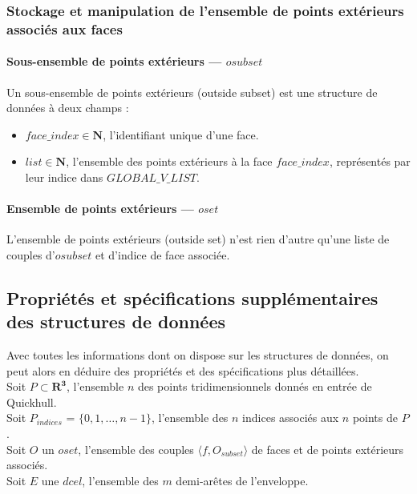 \documentclass[]{article}
\begin{document}
\subsubsection{Stockage et manipulation de l'ensemble de points extérieurs associés aux faces}
\paragraph*{Sous-ensemble de points extérieurs — $osubset$}
Un sous-ensemble de points extérieurs (outside subset) est une structure de données à deux champs :
\begin{itemize}
	\item $face\_index \in \mathbf{N}$, l'identifiant unique d'une face.
	\item $list \in \mathbf{N}$, l'ensemble des points extérieurs à la face $face\_index$, représentés par leur indice dans $GLOBAL\_V\_LIST$.
\end{itemize}

\paragraph*{Ensemble de points extérieurs — $oset$}
L'ensemble de points extérieurs (outside set) n'est rien d'autre qu'une liste de couples d'$osubset$ et d'indice de face associée.

\subsection{Propriétés et spécifications supplémentaires des structures de données}
Avec toutes les informations dont on dispose sur les structures de données, on peut alors en déduire des propriétés et des spécifications plus détaillées.\\

Soit $P \subset \mathbf{R^3} $, l'ensemble $n$ des points tridimensionnels donnés en entrée de Quickhull.\\
Soit $P_{indices}$ = $\{0,1,\ldots,n - 1\}$, l'ensemble des $n$ indices associés aux $n$ points de $P$.\\
Soit $O$ un $oset$, l'ensemble des couples $\langle f, O_{subset} \rangle$ de faces et de points extérieurs associés.\\
Soit $E$ une $dcel$, l'ensemble des $m$ demi-arêtes de l'enveloppe.\\
\end{document}
